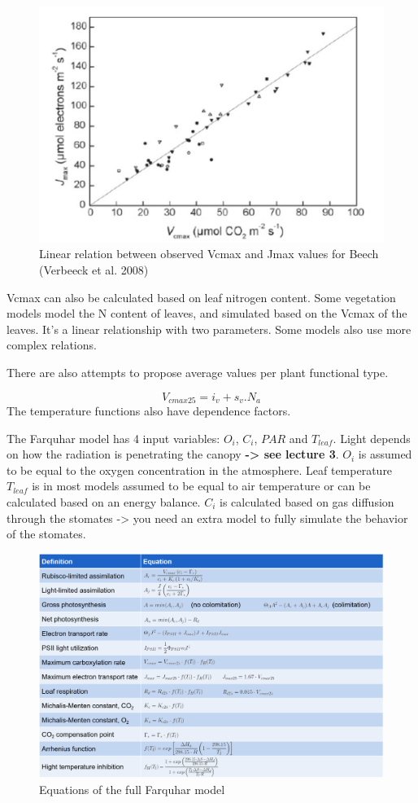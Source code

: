 \documentclass[
  12pt,
  oneside]{book}
\begin{document}
\begin{figure}

{\centering \includegraphics[width=0.8\linewidth]{figures/chap2/vcmax_jmax} 

}

\caption{Linear relation between observed Vcmax and Jmax values for Beech (Verbeeck et al. 2008)}\label{fig:f29}
\end{figure}

Vcmax can also be calculated based on leaf nitrogen content. Some vegetation models model the N content of leaves, and simulated based on the Vcmax of the leaves. It's a linear relationship with two parameters. Some models also use more complex relations.

There are also attempts to propose average values per plant functional type.

\[
V_{cmax25} = i_v + s_v.N_a
\]
The temperature functions also have dependence factors.

The Farquhar model has 4 input variables: \(O_i\), \(C_i\), \(PAR\) and \(T_{leaf}\). Light depends on how the radiation is penetrating the canopy \textbf{-\textgreater{} see lecture 3}. \(O_i\) is assumed to be equal to the oxygen concentration in the atmosphere. Leaf temperature \(T_{leaf}\) is in most models assumed to be equal to air temperature or can be calculated based on an energy balance. \(C_i\) is calculated based on gas diffusion through the stomates -\textgreater{} you need an extra model to fully simulate the behavior of the stomates.

\begin{figure}

{\centering \includegraphics[width=0.8\linewidth]{figures/chap2/full_farquhar} 

}

\caption{Equations of the full Farquhar model}\label{fig:f210}
\end{figure}
\end{document}
